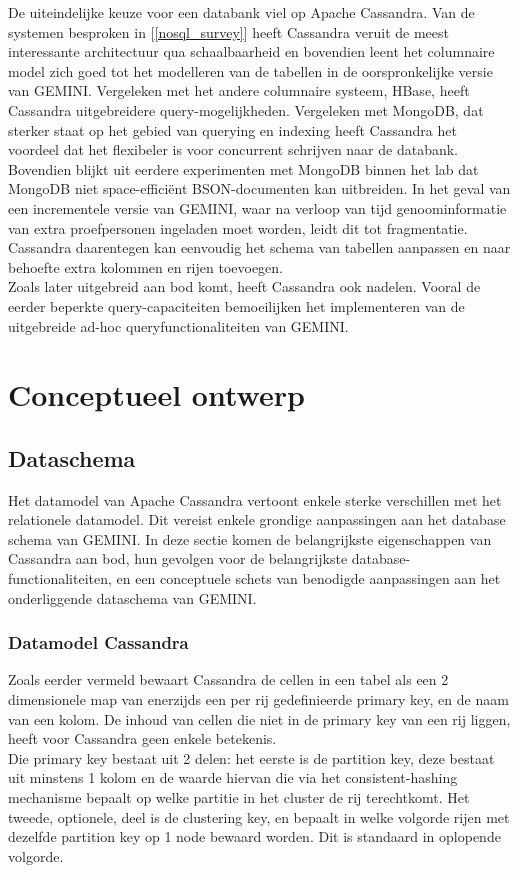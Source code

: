 De uiteindelijke keuze voor een databank viel op Apache Cassandra. Van de systemen besproken in [\ref{nosql_survey}] heeft Cassandra veruit de meest interessante architectuur qua schaalbaarheid en bovendien leent het columnaire model zich goed tot het modelleren van de tabellen in de oorspronkelijke versie van GEMINI. Vergeleken met het andere columnaire systeem, HBase, heeft Cassandra uitgebreidere query-mogelijkheden. Vergeleken met MongoDB, dat sterker staat op het gebied van querying en indexing heeft Cassandra het voordeel dat het flexibeler is voor concurrent schrijven naar de databank. Bovendien blijkt uit eerdere experimenten met MongoDB binnen het lab dat MongoDB niet space-effici\"ent BSON-documenten kan uitbreiden. In het geval van een incrementele versie van GEMINI, waar na verloop van tijd genoominformatie van extra proefpersonen ingeladen moet worden, leidt dit tot fragmentatie. Cassandra daarentegen kan eenvoudig het schema van tabellen aanpassen en naar behoefte extra kolommen en rijen toevoegen.\\
Zoals later uitgebreid aan bod komt, heeft Cassandra ook nadelen. Vooral de eerder beperkte query-capaciteiten bemoeilijken het implementeren van de uitgebreide ad-hoc queryfunctionaliteiten van GEMINI.

\section{Conceptueel ontwerp}

\subsection{Dataschema}

\label{cassandra_datamodel}

Het datamodel van Apache Cassandra vertoont enkele sterke verschillen met het relationele datamodel. Dit vereist enkele grondige aanpassingen aan het database schema van GEMINI. In deze sectie komen de belangrijkste eigenschappen van Cassandra aan bod, hun gevolgen voor de belangrijkste database-functionaliteiten, en een conceptuele schets van benodigde aanpassingen aan het onderliggende dataschema van GEMINI.

\subsubsection{Datamodel Cassandra}

Zoals eerder vermeld bewaart Cassandra de cellen in een tabel als een 2 dimensionele map van enerzijds een per rij gedefinieerde primary key, en de naam van een kolom. De inhoud van cellen die niet in de primary key van een rij liggen, heeft voor Cassandra geen enkele betekenis.\\
Die primary key bestaat uit 2 delen: het eerste is de partition key, deze bestaat uit minstens 1 kolom en de waarde hiervan die via het consistent-hashing mechanisme bepaalt op welke partitie in het cluster de rij terechtkomt. Het tweede, optionele, deel is de clustering key, en bepaalt in welke volgorde rijen met dezelfde partition key op 1 node bewaard worden. Dit is standaard in oplopende volgorde.\\


